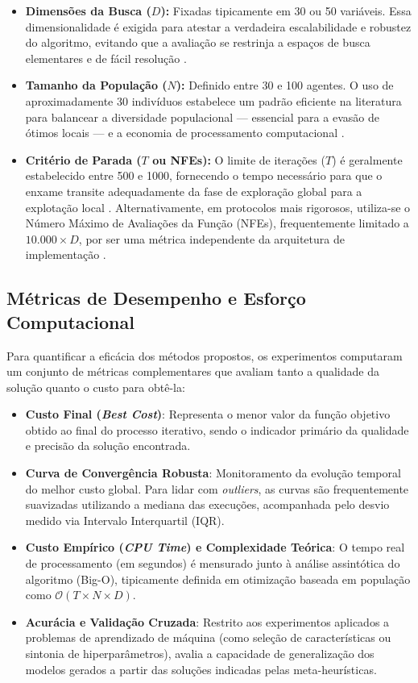 \documentclass[12pt, a4paper, oneside]{report}
\begin{document}
\begin{itemize}
    \item \textbf{Dimensões da Busca ($D$):} Fixadas tipicamente em 30 ou 50 variáveis. Essa dimensionalidade é exigida para atestar a verdadeira escalabilidade e robustez do algoritmo, evitando que a avaliação se restrinja a espaços de busca elementares e de fácil resolução \citep{huang2023evaluation, ismail2026beyond, zhong2022beluga}.
    \item \textbf{Tamanho da População ($N$):} Definido entre 30 e 100 agentes. O uso de aproximadamente 30 indivíduos estabelece um padrão eficiente na literatura para balancear a diversidade populacional — essencial para a evasão de ótimos locais — e a economia de processamento computacional \citep{huang2023evaluation}.
    \item \textbf{Critério de Parada ($T$ ou NFEs):} O limite de iterações ($T$) é geralmente estabelecido entre 500 e 1000, fornecendo o tempo necessário para que o enxame transite adequadamente da fase de exploração global para a explotação local \citep{huang2023evaluation, zhong2022beluga}. Alternativamente, em protocolos mais rigorosos, utiliza-se o Número Máximo de Avaliações da Função (NFEs), frequentemente limitado a $10.000 \times D$, por ser uma métrica independente da arquitetura de implementação \citep{ismail2026beyond}.
\end{itemize}

\subsection{Métricas de Desempenho e Esforço Computacional}

Para quantificar a eficácia dos métodos propostos, os experimentos computaram um conjunto de métricas complementares que avaliam tanto a qualidade da solução quanto o custo para obtê-la:

\begin{itemize}
    \item \textbf{Custo Final (\textit{Best Cost})}: Representa o menor valor da função objetivo obtido ao final do processo iterativo, sendo o indicador primário da qualidade e precisão da solução encontrada.
    \item \textbf{Curva de Convergência Robusta}: Monitoramento da evolução temporal do melhor custo global. Para lidar com \textit{outliers}, as curvas são frequentemente suavizadas utilizando a mediana das execuções, acompanhada pelo desvio medido via Intervalo Interquartil (IQR).
    \item \textbf{Custo Empírico (\textit{CPU Time}) e Complexidade Teórica}: O tempo real de processamento (em segundos) é mensurado junto à análise assintótica do algoritmo (Big-O), tipicamente definida em otimização baseada em população como $\mathcal{O}(T \times N \times D)$.
    \item \textbf{Acurácia e Validação Cruzada}: Restrito aos experimentos aplicados a problemas de aprendizado de máquina (como seleção de características ou sintonia de hiperparâmetros), avalia a capacidade de generalização dos modelos gerados a partir das soluções indicadas pelas meta-heurísticas.
\end{itemize}
\end{document}
